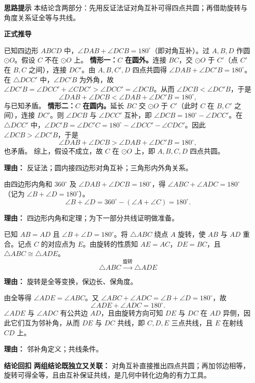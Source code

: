 \begin{proofbox}
	\textbf{\textcolor{CProof}{思路提示}}
	本结论含两部分：先用反证法证对角互补可得四点共圆；再借助旋转与角度关系证全等与共线。

	\medskip
	\textbf{\textcolor{CProof}{正式推导}}
	\begin{description}[style=nextline, leftmargin=2.8em, labelsep=0.5em, itemsep=0.55em]
		\item[\textbf{步骤一（四点共圆反证）：}]
			已知四边形 $ABCD$ 中，$\angle DAB+\angle DCB=180^\circ$（即对角互补）。过 $A,B,D$ 作圆 $\odot O$。假设 $C$ 不在 $\odot O$ 上。 \textbf{情形一：$C$ 在圆外。}连接 $BC$，交 $\odot O$ 于 $C'$（点 $C'$ 在 $B,C$ 之间），连接 $DC'$。由 $A,B,C',D$ 四点共圆得 $\angle DAB + \angle DC'B = 180^\circ$。在 $\triangle DCC'$ 中，$\angle DC'B$ 为外角，故 $\angle DC'B = \angle DCC' + \angle CDC' > \angle DCC' = \angle DCB$。从而 $\angle DCB < \angle DC'B$，于是
			\[
				\angle DAB + \angle DCB < \angle DAB + \angle DC'B = 180^\circ,
			\]
			与已知矛盾。 \textbf{情形二：$C$ 在圆内。}延长 $BC$ 交 $\odot O$ 于 $C'$（此时 $C$ 在 $B,C'$ 之间），连接 $DC'$。则 $\angle DCB$ 与 $\angle DCC'$ 互补，即 $\angle DCB = 180^\circ - \angle DCC'$。在 $\triangle DCC'$ 中，$\angle DC'B = \angle DC'C = 180^\circ - \angle DCC' - \angle CDC'$。因此 $\angle DCB > \angle DC'B$，于是
			\[
				\angle DAB + \angle DCB > \angle DAB + \angle DC'B = 180^\circ,
			\]
			也矛盾。 综上，假设不成立，故 $C$ 在 $\odot O$ 上，即 $A,B,C,D$ 四点共圆。
			\par\textbf{理由：} 反证法；圆内接四边形对角互补；三角形内外角关系。
		\item[\textbf{步骤二（推出另一组对角互补）：}]
			由四边形内角和 $360^\circ$ 及 $\angle DAB+\angle DCB=180^\circ$，得 $\angle ABC+\angle ADC = 180^\circ$（记为 $\angle B+\angle D=180^\circ$）。
			\[
				\angle B+\angle D = 360^\circ-(\angle A+\angle C) = 180^\circ.
			\]
			\par\textbf{理由：} 四边形内角和定理；为下一部分共线证明做准备。
		\item[\textbf{步骤三（旋转构造全等）：}]
			已知 $AB=AD$ 且 $\angle B+\angle D=180^\circ$。将 $\triangle ABC$ 绕点 $A$ 旋转，使 $AB$ 与 $AD$ 重合。记点 $C$ 的对应点为 $E$。由旋转的性质知 $AE=AC$，$DE=BC$，且 $\triangle ABC \cong \triangle ADE$。
			\[
				\triangle ABC \xrightarrow{\text{旋转}} \triangle ADE
			\]
			\par\textbf{理由：} 旋转是全等变换，保边长、保角度。
		\item[\textbf{步骤四（证明 $C,D,E$ 共线）：}]
			由全等得 $\angle ADE = \angle ABC$。又 $\angle ABC+\angle ADC = \angle B+\angle D = 180^\circ$，故
			\[
				\angle ADE + \angle ADC = 180^\circ.
			\]
			$\angle ADE$ 与 $\angle ADC$ 有公共边 $AD$，且由旋转方向可知 $DE$ 与 $DC$ 在 $AD$ 异侧，因此它们互为邻补角，从而 $DE$ 与 $DC$ 共线，即 $C,D,E$ 三点共线，且 $E$ 在射线 $CD$ 上。
			\par\textbf{理由：} 邻补角定义；共线条件。
	\end{description}

	\medskip
	\textbf{\textcolor{CProof}{结论回扣}}
	\textbf{两组结论既独立又关联：} 对角互补直接推出四点共圆；再加邻边相等，旋转可得全等，且由互补保证共线，是几何中转化边角的有力工具。
\end{proofbox}
